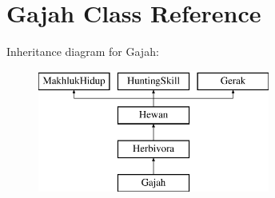 \hypertarget{class_gajah}{}\section{Gajah Class Reference}
\label{class_gajah}
Inheritance diagram for Gajah\+:\begin{figure}[H]
\begin{center}
\leavevmode
\includegraphics[height=4.000000cm]{class_gajah}
\end{center}
\end{figure}
